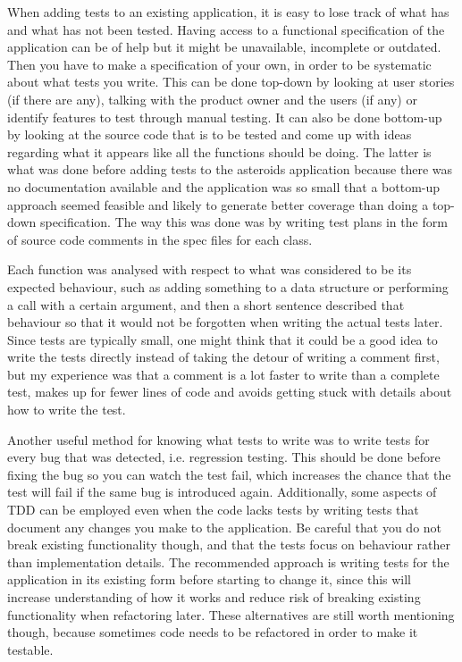 \documentclass[11pt]{article}
\begin{document}
When adding tests to an existing application, it is easy to lose track of what has and what has not been tested. Having access to a functional specification of the application can be of help but it might be unavailable, incomplete or outdated. Then you have to make a specification of your own, in order to be systematic about what tests you write. This can be done top-down by looking at user stories (if there are any), talking with the product owner and the users (if any) or identify features to test through manual testing. It can also be done bottom-up by looking at the source code that is to be tested and come up with ideas regarding what it appears like all the functions should be doing. The latter is what was done before adding tests to the asteroids application because there was no documentation available and the application was so small that a bottom-up approach seemed feasible and likely to generate better coverage than doing a top-down specification. The way this was done was by writing test plans in the form of source code comments in the \gls{spec} files for each class.

Each function was analysed with respect to what was considered to be its expected behaviour, such as adding something to a data structure or performing a call with a certain argument, and then a short sentence described that behaviour so that it would not be forgotten when writing the actual tests later. Since tests are typically small, one might think that it could be a good idea to write the tests directly instead of taking the detour of writing a comment first, but my experience was that a comment is a lot faster to write than a complete test, makes up for fewer lines of code and avoids getting stuck with details about how to write the test.

Another useful method for knowing what tests to write was to write tests for every bug that was detected, i.e. regression testing. This should be done before fixing the bug so you can watch the test fail, which increases the chance that the test will fail if the same bug is introduced again. Additionally, some aspects of TDD can be employed even when the code lacks tests by writing tests that document any changes you make to the application. Be careful that you do not break existing functionality though, and that the tests focus on behaviour rather than implementation details. The recommended approach is writing tests for the application in its existing form before starting to change it, since this will increase understanding of how it works and reduce risk of breaking existing functionality when refactoring later. These alternatives are still worth mentioning though, because sometimes code needs to be refactored in order to make it testable.
\end{document}
